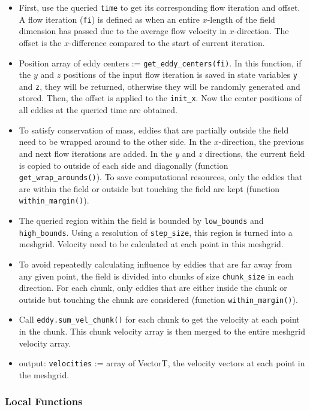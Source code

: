 \documentclass[12pt, titlepage]{article}
\begin{document}
\begin{itemize}
  \item First, use the queried \texttt{time} to get its corresponding flow iteration and offset. A flow iteration (\texttt{fi}) is defined as when an entire $x$-length of the field dimension has passed due to the average flow velocity in $x$-direction. The offset is the $x$-difference compared to the start of current iteration.
  \item Position array of eddy centers := \texttt{get\_eddy\_centers(fi)}. In this function, if the $y$ and $z$ positions of the input flow iteration is saved in state variables \texttt{y} and \texttt{z}, they will be returned, otherwise they will be randomly generated and stored. Then, the offset is applied to the \texttt{init\_x}. Now the center positions of all eddies at the queried time are obtained.
  \item To satisfy conservation of mass, eddies that are partially outside the field need to be wrapped around to the other side. In the $x$-direction, the previous and next flow iterations are added. In the $y$ and $z$ directions, the current field is copied to outside of each side and diagonally (function \texttt{get\_wrap\_arounds()}). To save computational resources, only the eddies that are within the field or outside but touching the field are kept (function \texttt{within\_margin()}).
  \item The queried region within the field is bounded by \texttt{low\_bounds} and \texttt{high\_bounds}. Using a resolution of \texttt{step\_size}, this region is turned into a meshgrid. Velocity need to be calculated at each point in this meshgrid.
  \item To avoid repeatedly calculating influence by eddies that are far away from any given point, the field is divided into chunks of size \texttt{chunk\_size} in each direction. For each chunk, only eddies that are either inside the chunk or outside but touching the chunk are considered (function \texttt{within\_margin()}).
  \item Call \texttt{eddy.sum\_vel\_chunk()} for each chunk to get the velocity at each point in the chunk. This chunk velocity array is then merged to the entire meshgrid velocity array.
  \item output: \texttt{velocities} := array of VectorT, the velocity vectors at each point in the meshgrid.
\end{itemize}

\subsubsection{Local Functions}
\end{document}
